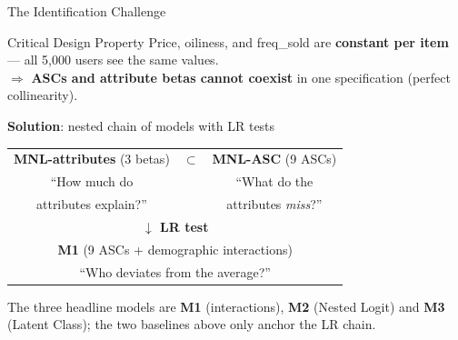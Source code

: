 \documentclass[10pt,aspectratio=169]{beamer}
\begin{document}
\begin{frame}{The Identification Challenge}
  \begin{alertblock}{Critical Design Property}
    Price, oiliness, and freq\_sold are \textbf{constant per item} ---
    all 5,000 users see the same values.\\[4pt]
    $\Rightarrow$ \textbf{ASCs and attribute betas cannot coexist} in one specification
    (perfect collinearity).
  \end{alertblock}

  \vspace{6pt}
  \textbf{Solution}: nested chain of models with LR tests

  \begin{center}
    \begin{tabular}{c c c}
      \textbf{MNL-attributes} (3 betas) & $\subset$ & \textbf{MNL-ASC} (9 ASCs) \\[4pt]
      ``How much do & & ``What do the \\
      attributes explain?'' & & attributes \emph{miss}?'' \\[8pt]
      \multicolumn{3}{c}{\textbf{$\downarrow$ LR test}} \\[4pt]
      \multicolumn{3}{c}{\textbf{M1} (9 ASCs + demographic interactions)} \\[4pt]
      \multicolumn{3}{c}{``Who deviates from the average?''}
    \end{tabular}
  \end{center}
  \vspace{4pt}
  \footnotesize The three headline models are \textbf{M1} (interactions),
  \textbf{M2} (Nested Logit) and \textbf{M3} (Latent Class); the two baselines
  above only anchor the LR chain.
\end{frame}
\end{document}
